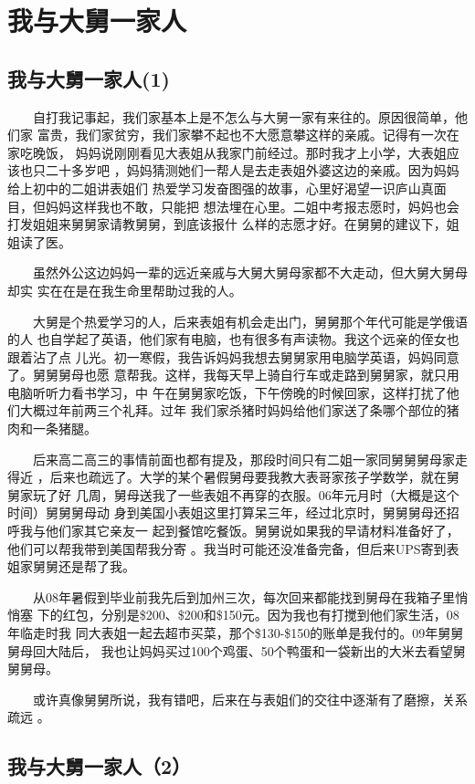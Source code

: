 \documentclass[12pt]{book}
\begin{document}
\chapter{我与大舅一家人}
\label{sec-8}
\section{我与大舅一家人(1)}
\label{sec-8-1}
　　自打我记事起，我们家基本上是不怎么与大舅一家有来往的。原因很简单，他们家
富贵，我们家贫穷，我们家攀不起也不大愿意攀这样的亲戚。记得有一次在家吃晚饭，
妈妈说刚刚看见大表姐从我家门前经过。那时我才上小学，大表姐应该也只二十多岁吧
，妈妈猜测她们一帮人是去走表姐外婆这边的亲戚。因为妈妈给上初中的二姐讲表姐们
热爱学习发奋图强的故事，心里好渴望一识庐山真面目，但妈妈这样我也不敢，只能把
想法埋在心里。二姐中考报志愿时，妈妈也会打发姐姐来舅舅家请教舅舅，到底该报什
么样的志愿才好。在舅舅的建议下，姐姐读了医。

　　虽然外公这边妈妈一辈的远近亲戚与大舅大舅母家都不大走动，但大舅大舅母却实
实在在是在我生命里帮助过我的人。

　　大舅是个热爱学习的人，后来表姐有机会走出门，舅舅那个年代可能是学俄语的人
也自学起了英语，他们家有电脑，也有很多有声读物。我这个远亲的侄女也跟着沾了点
儿光。初一寒假，我告诉妈妈我想去舅舅家用电脑学英语，妈妈同意了。舅舅舅母也愿
意帮我。这样，我每天早上骑自行车或走路到舅舅家，就只用电脑听听力看书学习，中
午在舅舅家吃饭，下午傍晚的时候回家，这样打扰了他们大概过年前两三个礼拜。过年
我们家杀猪时妈妈给他们家送了条哪个部位的猪肉和一条猪腿。

　　后来高二高三的事情前面也都有提及，那段时间只有二姐一家同舅舅舅母家走得近
，后来也疏远了。大学的某个暑假舅母要我教大表哥家孩子学数学，就在舅舅家玩了好
几周，舅母送我了一些表姐不再穿的衣服。06年元月时（大概是这个时间）舅舅舅母动
身到美国小表姐这里打算呆三年，经过北京时，舅舅舅母还招呼我与他们家其它亲友一
起到餐馆吃餐饭。舅舅说如果我的早请材料准备好了，他们可以帮我带到美国帮我分寄
。我当时可能还没准备完备，但后来UPS寄到表姐家舅舅还是帮了我。

　　从08年暑假到毕业前我先后到加州三次，每次回来都能找到舅母在我箱子里悄悄塞
下的红包，分别是\$200、\$200和\$150元。因为我也有打搅到他们家生活，08年临走时我
同大表姐一起去超市买菜，那个\$130-\$150的账单是我付的。09年舅舅舅母回大陆后，
我也让妈妈买过100个鸡蛋、50个鸭蛋和一袋新出的大米去看望舅舅舅母。

　　或许真像舅舅所说，我有错吧，后来在与表姐们的交往中逐渐有了磨擦，关系疏远
。
\section{我与大舅一家人（2）}
\label{sec-8-2}
\end{document}
